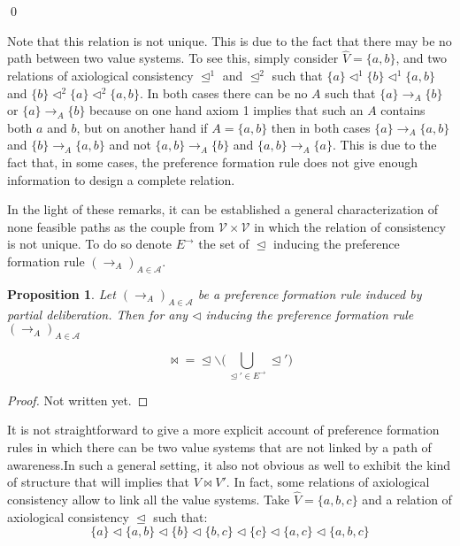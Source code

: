 \documentclass[11pt]{article}
\newtheorem{proposition}{Proposition}
\begin{document}
 \qed
 
  Note that this relation is not unique. This is due to the fact that there may be no path between two value systems. To see this, simply consider $\hat{V}=\{a,b\}$, and two relations of axiological consistency $\trianglelefteq^1$ and $\trianglelefteq^2$ such that $\{a\}\triangleleft^1\{b\}\triangleleft^1\{a,b\}$ and $\{b\}\triangleleft^2\{a\}\triangleleft^2\{a,b\}$. In both cases there can be no $A$ such that $\{a\}\rightarrow_A \{b\}$ or $\{a\}\rightarrow_A \{b\}$ because on one hand axiom 1 implies that such an $A$ contains both $a$ and $b$, but on another hand if $A=\{a,b\}$ then in both cases $\{a\}\rightarrow_A \{a,b\}$ and $\{b\}\rightarrow_A \{a,b\}$ and not $\{a,b\}\rightarrow_A \{b\}$ and $\{a,b\}\rightarrow_A \{a\}$. This is due to the fact that, in some cases, the preference formation rule does not give enough information to design a complete relation. 
  
  In the light of these remarks, it can be established a general characterization of none feasible paths as the couple from $\mathcal{V}\times\mathcal{V}$ in which the relation of consistency is not unique. To do so denote $E^{\rightarrow}$ the set of $\trianglelefteq$ inducing the preference formation rule $(\rightarrow_A)_{A\in\mathcal{A}}$.
  
 \begin{proposition} Let $(\rightarrow_A)_{A\in\mathcal{A}}$ be a preference formation rule induced by partial deliberation. Then for any $\triangleleft$ inducing the preference formation rule $(\rightarrow_A)_{A\in\mathcal{A}}$
 
 \begin{equation*}
 \bowtie = \trianglelefteq \backslash \big(\bigcup_{\trianglelefteq' \in E^\rightarrow}\trianglelefteq'\big)
 \end{equation*}
 
 \end{proposition}
 
 \begin{proof}
 Not written yet.
 \end{proof}
 
 It is not straightforward to give a more explicit account of preference formation rules in which there can be two value systems that are not linked by a path of awareness.In such a general setting, it also not obvious as well to exhibit the kind of structure that will implies that $V\bowtie V'$. In fact, some relations of axiological consistency allow to link all the value systems. Take $\hat{V}= \{a,b,c\}$ and a relation of axiological consistency $\trianglelefteq$ such that:
 \[
 \{a\}\triangleleft \{a,b\} \triangleleft \{b\}\triangleleft \{b,c\}\triangleleft \{c\}\triangleleft \{a,c\}\triangleleft\{a,b,c\}
 \]
 
\end{document}
